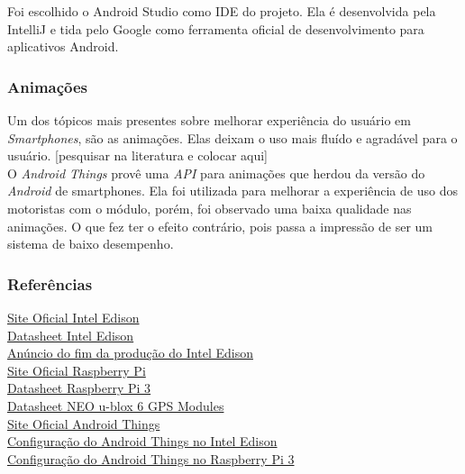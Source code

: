 \documentclass[
	12pt,				%
	oneside,			%
	a4paper,			%
	brazil				%
]{abntex2}
\begin{document}
{Foi escolhido o Android Studio como IDE do projeto. Ela é desenvolvida pela IntelliJ e tida pelo Google como ferramenta oficial de desenvolvimento para aplicativos Android.

\subsubsection{Animações}

Um dos tópicos mais presentes sobre melhorar experiência do usuário em \textit{Smartphones}, são as animações. Elas deixam o uso mais fluído e agradável para o usuário. [pesquisar na literatura e colocar aqui]\\

O \textit{Android Things} provê uma \textit{API} para animações que herdou da versão do \textit{Android} de smartphones. Ela foi utilizada para melhorar a experiência de uso dos motoristas com o módulo, porém, foi observado uma baixa qualidade nas animações. O que fez ter o efeito contrário, pois passa a impressão de ser um sistema de baixo desempenho.\\

\subsubsection{Referências}

\href{https://software.intel.com/en-us/iot/hardware/edison}{Site Oficial Intel Edison}\\
\href{http://download.intel.com/support/edison/sb/edisonmodule_hg_331189004.pdf}{Datasheet Intel Edison}\\
\href{https://www.embarcados.com.br/placas-intel-edison-galileo-e-joule-serao-descontinuadas/}{Anúncio do fim da produção do Intel Edison}\\
\href{https://www.raspberrypi.org/products/raspberry-pi-3-model-b/}{Site Oficial Raspberry Pi}\\
\href{https://www.raspberrypi.org/documentation/hardware/computemodule/RPI-CM-DATASHEET-V1_0.pdf}{Datasheet Raspberry Pi 3}\\
\href{https://www.u-blox.com/sites/default/files/products/documents/NEO-6_DataSheet_(GPS.G6-HW-09005).pdf}{Datasheet NEO u-blox 6 GPS Modules}\\
\href{https://developer.android.com/things/index.html}{Site Oficial Android Things}\\
\href{https://developer.android.com/things/hardware/edison.html}{Configuração do Android Things no Intel Edison}\\
\href{https://developer.android.com/things/hardware/raspberrypi.html}{Configuração do Android Things no Raspberry Pi 3}\\

}
\end{document}
